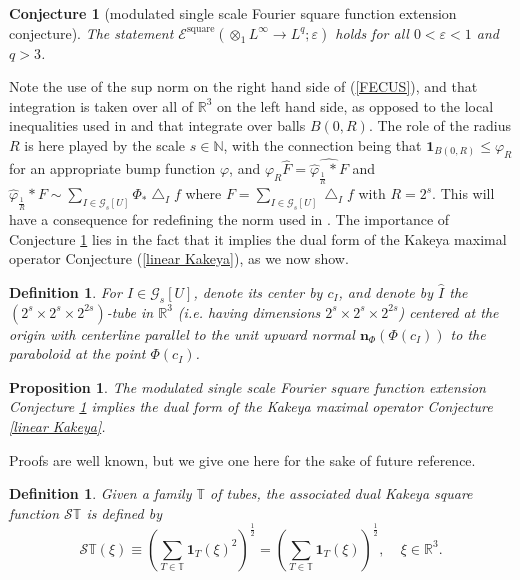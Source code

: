 \documentclass{amsart}%
\theoremstyle{plain}
\newtheorem{conjecture}[theorem]{Conjecture}
\newtheorem{definition}[theorem]{Definition}
\newtheorem{proposition}[theorem]{Proposition}
\numberwithin{equation}{section}
\begin{document}
\begin{conjecture}
[modulated single scale Fourier square function extension conjecture]%
\label{ssFsfec}The statement $\mathcal{E}^{\operatorname*{square}}\left(
\otimes_{1}L^{\infty}\rightarrow L^{q};\varepsilon\right)  $ holds for all
$0<\varepsilon<1$ and $q>3$.
\end{conjecture}

Note the use of the sup norm on the right hand side of (\ref{FECUS}), and that
integration is taken over all of $\mathbb{R}^{3}$ on the left hand side, as
opposed to the local inequalities used in \cite{BeCaTa} and \cite{BoGu} that
integrate over balls $B\left(  0,R\right)  $. The role of the radius $R$ is
here played by the scale $s\in\mathbb{N}$, with the connection being that
$\mathbf{1}_{B\left(  0,R\right)  }\leq\varphi_{R}$ for an appropriate bump
function $\varphi$, and $\varphi_{R}\widehat{F}=\widehat{\widehat{\varphi
}_{\frac{1}{R}}\ast F}$ and $\widehat{\varphi}_{\frac{1}{R}}\ast F\sim
\sum_{I\in\mathcal{G}_{s}\left[  U\right]  }\Phi_{\ast}\bigtriangleup_{I}f$
where $F=\sum_{I\in\mathcal{G}_{s}\left[  U\right]  }\bigtriangleup_{I}f$ with
$R=2^{s}$. This will have a consequence for redefining the norm used in
\cite[Section 2.1]{BoGu}. The importance of Conjecture \ref{ssFsfec} lies in
the fact that it implies the dual form of the Kakeya maximal operator
Conjecture (\ref{linear Kakeya}), as we now show.

\begin{definition}
\label{I hat}For $I\in\mathcal{G}_{s}\left[  U\right]  $, denote its center by
$c_{I}$, and denote by $\widehat{I}$ the $\left(  2^{s}\times2^{s}\times
2^{2s}\right)  $-tube in $\mathbb{R}^{3}$ (i.e. having dimensions $2^{s}%
\times2^{s}\times2^{2s}$) centered at the origin with centerline parallel to
the unit upward normal $\mathbf{n}_{\Phi}\left(  \Phi\left(  c_{I}\right)
\right)  $ to the paraboloid at the point $\Phi\left(  c_{I}\right)  $.
\end{definition}

\begin{proposition}
\label{Kak Four}The modulated single scale Fourier square function extension
Conjecture \ref{ssFsfec} implies the dual form of the Kakeya maximal operator
Conjecture \ref{linear Kakeya}.
\end{proposition}

Proofs are well known, but we give one here for the sake of future reference.

\begin{definition}
\label{def tube square}Given a family $\mathbb{T}$ of tubes, the associated
\emph{dual Kakeya square function} $\mathcal{S}\mathbb{T}$ is defined by%
\[
\mathcal{S}\mathbb{T}\left(  \xi\right)  \equiv\left(  \sum_{T\in\mathbb{T}%
}\mathbf{1}_{T}\left(  \xi\right)  ^{2}\right)  ^{\frac{1}{2}}=\left(
\sum_{T\in\mathbb{T}}\mathbf{1}_{T}\left(  \xi\right)  \right)  ^{\frac{1}{2}%
},\ \ \ \ \ \xi\in\mathbb{R}^{3}.
\]

\end{definition}
\end{document}
